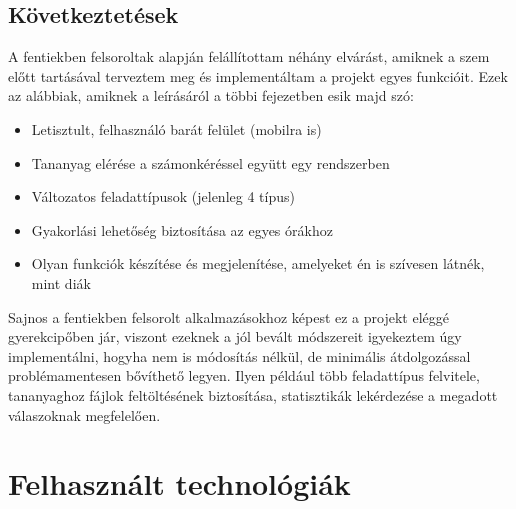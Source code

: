 \documentclass[
]{thesis-ekf}
\theoremstyle{definition}
\theoremstyle{remark}
\begin{document}
	\section{Következtetések}
	A fentiekben felsoroltak alapján felállítottam néhány elvárást, amiknek a szem előtt tartásával terveztem meg és implementáltam a projekt egyes funkcióit. Ezek az alábbiak, amiknek a leírásáról a többi fejezetben esik majd szó:
	\begin{itemize}
		\item Letisztult, felhasználó barát felület (mobilra is)
		\item Tananyag elérése a számonkéréssel együtt egy rendszerben
		\item Változatos feladattípusok (jelenleg 4 típus)
		\item Gyakorlási lehetőség biztosítása az egyes órákhoz
		\item Olyan funkciók készítése és megjelenítése, amelyeket én is szívesen látnék, mint diák
	\end{itemize}
	Sajnos a fentiekben felsorolt alkalmazásokhoz képest ez a projekt eléggé gyerekcipőben jár, viszont ezeknek a jól bevált módszereit igyekeztem úgy implementálni, hogyha nem is módosítás nélkül, de minimális átdolgozással problémamentesen bővíthető legyen. Ilyen például több feladattípus felvitele, tananyaghoz fájlok feltöltésének biztosítása, statisztikák lekérdezése a megadott válaszoknak megfelelően.
	
	
	\chapter{Felhasznált technológiák}\label{Technologiak-bemutat}
\end{document}
